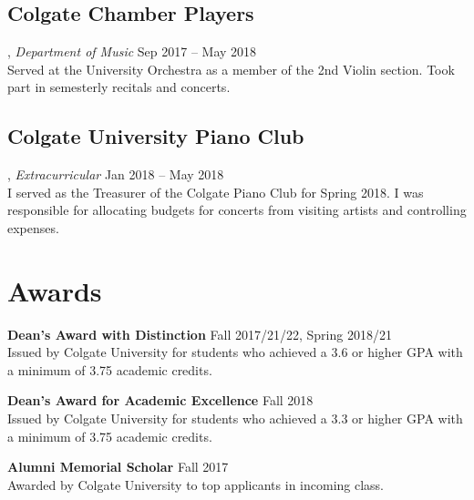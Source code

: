 \documentclass[11pt, letterpaper]{article}
\begin{document}
\subsection{Colgate Chamber Players}, \emph{Department of Music} \hfill Sep 2017 – May 2018\\
\noindent Served at the University Orchestra as a member of the 2nd Violin section. Took part in semesterly recitals and concerts.

\subsection{Colgate University Piano Club}, \emph{Extracurricular} \hfill Jan 2018 – May 2018\\
I served as the Treasurer of the Colgate Piano Club for Spring 2018. I was responsible for allocating budgets for concerts from visiting artists and controlling expenses.
\section{Awards}
\noindent\textbf{Dean's Award with Distinction} \hfill Fall 2017/21/22, Spring 2018/21\\
Issued by Colgate University for students who achieved a 3.6 or higher GPA with a minimum of 3.75 academic credits.

\noindent\textbf{Dean's Award for Academic Excellence} \hfill Fall 2018\\
Issued by Colgate University for students who achieved a 3.3 or higher GPA with a minimum of 3.75 academic credits.

\noindent\textbf{Alumni Memorial Scholar} \hfill Fall 2017\\
Awarded by Colgate University to top applicants in incoming class.
\end{document}
